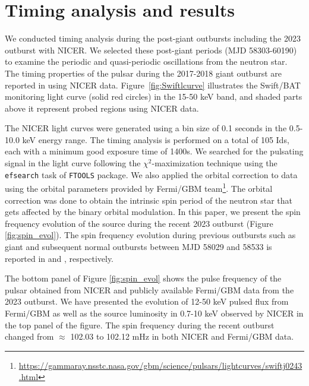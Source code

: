 \documentclass[twocolumn,trackchanges]{aastex631}
\begin{document}
\section{Timing analysis and results}
\label{sec:3}
We conducted timing analysis during the post-giant outbursts including the 2023 outburst with NICER. We selected these post-giant periods (MJD 58303-60190) to examine the periodic and quasi-periodic oscillations from the neutron star. The timing properties of the pulsar during the 2017-2018 giant outburst are reported in  \citet{2018ApJ...863....9W} using NICER data. Figure~\ref{fig:Swiftlcurve} illustrates the Swift/BAT monitoring light curve (solid red circles) in the 15-50 keV band, and shaded parts above it represent probed regions using NICER data.

The NICER light curves were generated using a bin size of 0.1 seconds in the 0.5-10.0 keV energy range. The timing analysis is performed on a total of 105 Ids, each with a minimum good exposure time of 1400s.  
We searched for the pulsating signal in the light curve following the $\chi^{2}$-maximization technique \citep{1987A&A...180..275L} using the \texttt{efsearch} task of \texttt{FTOOLS} package. We also applied the orbital correction to data using the orbital parameters provided by Fermi/GBM team\footnote{\url{https://gammaray.nsstc.nasa.gov/gbm/science/pulsars/lightcurves/swiftj0243.html}}. The orbital correction was done to obtain the intrinsic spin period of the neutron star that gets affected by the binary orbital modulation. In this paper, we present the spin frequency evolution of the source during the recent 2023 outburst (Figure \ref{fig:spin_evol}). The spin frequency evolution during previous outbursts such as giant and subsequent normal outbursts between MJD  58029 and 58533 is reported in \citet{2018ApJ...863....9W} and \citet{2023MNRAS.522.6115S}, respectively.



The bottom panel of Figure \ref{fig:spin_evol} shows the pulse frequency of the pulsar obtained from NICER and publicly available Fermi/GBM data from the 2023 outburst. We have presented the evolution of 12-50 keV pulsed flux from Fermi/GBM as well as the source luminosity in 0.7-10 keV observed by NICER in the top panel of the figure. The spin frequency during the recent outburst changed from $\approx$ 102.03 to 102.12 mHz in both NICER and Fermi/GBM data. 
\end{document}

